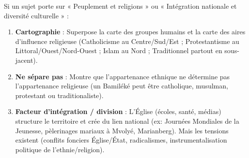 \documentclass[11pt]{article}
\begin{document}
\begin{methode}
Si un sujet porte sur « Peuplement et religions » ou « Intégration nationale et diversité culturelle » :
\begin{enumerate}
    \item \textbf{Cartographie} : Superpose la carte des groupes humains et la carte des aires d'influence religieuse (Catholicisme au Centre/Sud/Est ; Protestantisme au Littoral/Ouest/Nord-Ouest ; Islam au Nord ; Traditionnel partout en sous-jacent).
    \item \textbf{Ne sépare pas} : Montre que l'appartenance ethnique ne détermine pas l'appartenance religieuse (un Bamiléké peut être catholique, musulman, protestant ou traditionaliste).
    \item \textbf{Facteur d'intégration / division} : L'Église (écoles, santé, médias) structure le territoire et crée du lien national (ex: Journées Mondiales de la Jeunesse, pèlerinages mariaux à Mvolyé, Marianberg). Mais les tensions existent (conflits fonciers Église/État, radicalismes, instrumentalisation politique de l'ethnie/religion).
\end{enumerate}
\end{methode}
\end{document}
